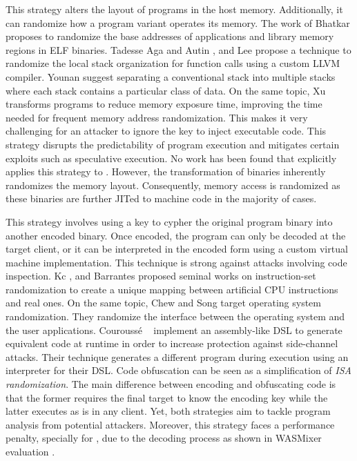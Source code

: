 This strategy alters the layout of programs in the host memory. 
Additionally, it can randomize how a program variant operates its memory. 
The work of Bhatkar \etal \cite{bhatkar03, bhatkar2005efficient} proposes to randomize the base addresses of applications and library memory regions in ELF binaries. 
Tadesse Aga and Autin \cite{aga2019smokestack}, and Lee \etal \cite{lee2021savior} propose a technique to randomize the local stack organization for function calls using a custom LLVM compiler.
Younan \etal \cite{Younan2006} suggest separating a conventional stack into multiple stacks where each stack contains a particular class of data. 
On the same topic, Xu \etal \cite{xu2020merr} transforms programs to reduce memory exposure time, improving the time needed for frequent memory address randomization. 
This makes it very challenging for an attacker to ignore the key to inject executable code. 
This strategy disrupts the predictability of program execution and mitigates certain exploits such as speculative execution.
No work has been found that explicitly applies this strategy to \Wasm.
However, the transformation of \Wasm binaries inherently randomizes the memory layout.
Consequently, memory access is randomized as these binaries are further JITed to machine code in the majority of cases.

This strategy involves using a key to cypher the original program binary into another encoded binary. 
Once encoded, the program can only be decoded at the target client, or it can be interpreted in the encoded form using a custom virtual machine implementation. 
This technique is strong against attacks involving code inspection. 
Kc \etal \cite{Kc03}, and Barrantes \etal \cite{barrantes2003randomized} proposed seminal works on instruction-set randomization 
to create a unique mapping between artificial CPU instructions and real ones.
On the same topic, Chew and Song \cite{Chew02mitigatingbuffer} target operating system randomization. They randomize the interface between the operating system and the user applications.
Courouss{\'e} \etal~\cite{courousse2016runtime} implement an assembly-like DSL to generate equivalent code at runtime in order to increase protection against side-channel attacks. Their technique generates a different program during execution using an interpreter for their DSL.
Code obfuscation \cite{wobfuscator} can be seen as a simplification of \emph{ISA randomization}. 
The main difference between encoding and obfuscating code is that the former requires the final target to know the encoding key while the latter executes as is in any client. 
Yet, both strategies aim to tackle program analysis from potential attackers. 
Moreover, this strategy faces a performance penalty, specially for \Wasm, due to the decoding process as shown in WASMixer evaluation \cite{wasmixer}.



